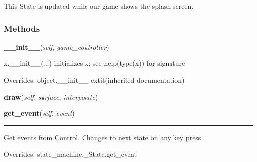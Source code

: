 This State is updated while our game shows the splash screen.



  \subsubsection{Methods}

    \vspace{0.5ex}

\hspace{.8\funcindent}\begin{boxedminipage}{\funcwidth}

    \raggedright \textbf{\_\_init\_\_}(\textit{self}, \textit{game\_controller})

\setlength{\parskip}{2ex}
    x.\_\_init\_\_(...) initializes x; see help(type(x)) for signature

\setlength{\parskip}{1ex}
      Overrides: object.\_\_init\_\_ 	extit{(inherited documentation)}

    \end{boxedminipage}

    \label{pygame-asteroids:states:intro:Introduction:draw}

    \vspace{0.5ex}

\hspace{.8\funcindent}\begin{boxedminipage}{\funcwidth}

    \raggedright \textbf{draw}(\textit{self}, \textit{surface}, \textit{interpolate})

\setlength{\parskip}{2ex}
\setlength{\parskip}{1ex}
    \end{boxedminipage}

    \vspace{0.5ex}

\hspace{.8\funcindent}\begin{boxedminipage}{\funcwidth}

    \raggedright \textbf{get\_event}(\textit{self}, \textit{event})

    \vspace{-1.5ex}

    \rule{\textwidth}{0.5\fboxrule}
\setlength{\parskip}{2ex}
    Get events from Control. Changes to next state on any key press.

\setlength{\parskip}{1ex}
      Overrides: state\_machine.\_State.get\_event

    \end{boxedminipage}

